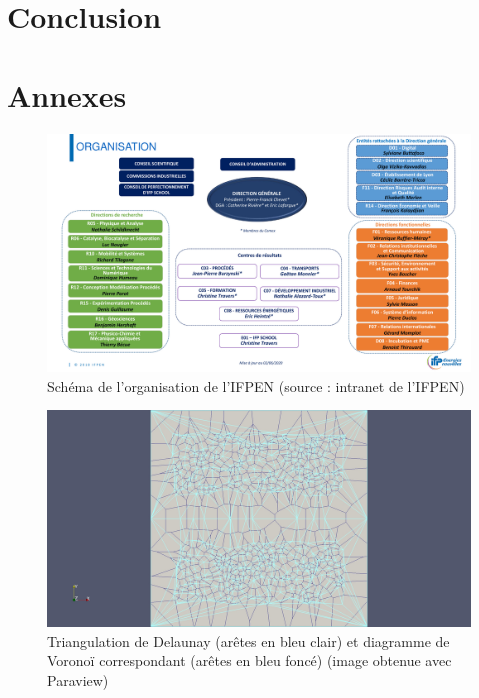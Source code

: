 \documentclass[12pt,a4paper]{report}
\begin{document}
\newpage
\section{Conclusion}

\newpage
\section{Annexes}

\begin{center}
\begin{figure}[htbp]
\includegraphics[scale=0.6, angle=90]{vf-schema-organisation-ifpen-marguerite.pdf}
\caption{Schéma de l'organisation de l'IFPEN (source : intranet de l'IFPEN)}
\label{ifpen_org}
\end{figure}
\end{center}
\clearpage

\begin{center}
\begin{figure}[htbp]
\includegraphics[scale=0.35, viewport=530 0 1680 1129, clip]{del_vor.jpg}
\caption{Triangulation de Delaunay (arêtes en bleu clair) et diagramme de Voronoï correspondant (arêtes en bleu foncé) (image obtenue avec Paraview)}
\label{del_vor}
\end{figure}
\end{center}
\clearpage
\end{document}
